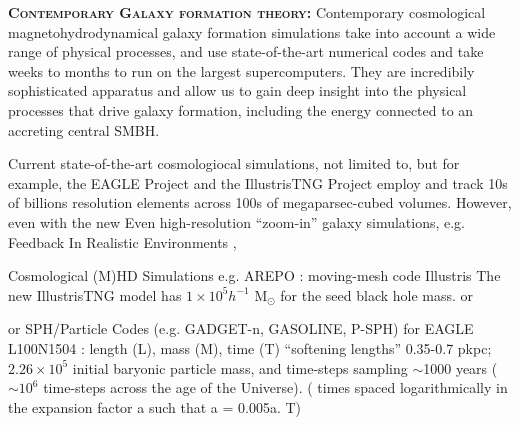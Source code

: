 \smallskip
\smallskip
\noindent
\textbf{\textsc{Contemporary Galaxy formation theory:}}
Contemporary cosmological magnetohydrodynamical galaxy formation simulations 
take into account a wide range of physical processes, and  
use state-of-the-art numerical codes and take weeks to months to run on the largest supercomputers. 
They are incredibily sophisticated apparatus and allow us to gain deep insight into the 
physical processes that drive galaxy formation, including the energy connected to 
an accreting central SMBH. 

\smallskip
\smallskip
\noindent
Current state-of-the-art cosmologiocal simulations, not limited to, but for example,  
the EAGLE Project \citep{Schaye2014, Crain2015} and the IllustrisTNG Project \citep{Pillepich2018} 
employ and track 10s of billions resolution elements across 100s of megaparsec-cubed volumes. 
However, even with the new 
Even high-resolution ``zoom-in'' galaxy simulations, 
e.g. Feedback In Realistic Environments \citep[FIRE-2; ][]{Hopkins2017}, 



Cosmological (M)HD Simulations
e.g. AREPO \citep{Springel2010}: moving-mesh code
Illustris 
The new IllustrisTNG model has $1\times10^{5} h^{-1}$ M$_{\odot}$ for the seed black hole mass. 
or 

or SPH/Particle Codes
(e.g. GADGET-n, GASOLINE, P-SPH)
for EAGLE 
L100N1504 : length (L), mass (M), time (T) 
``softening lengths'' 0.35-0.7 pkpc; $2.26\times10^{5}$  initial baryonic particle mass, 
and time-steps sampling $\sim$1000 years ($\sim10^{6}$ time-steps across the age of the Universe). 
( times spaced logarithmically in the expansion factor a such that  a = 0.005a. T)

